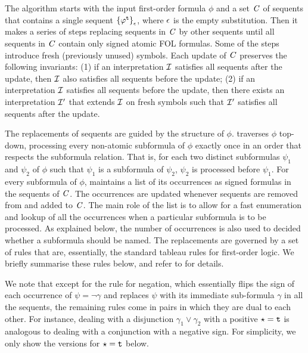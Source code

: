 The \newcnf{} algorithm starts with the input first-order formula $\phi$ and a
set $\mathit{C}$ of sequents that contains a single sequent
${\{{\varphi}^{\mathtt{t}}\}}_{\epsilon}$, where $\epsilon$ is
the empty substitution. Then it makes a series of steps replacing sequents in
$\mathit{C}$ by other sequents until all sequents in $\mathit{C}$ contain only signed atomic
FOL formulas. Some of the steps introduce fresh (previously unused) symbols. 
Each update of $\mathit{C}$ preserves the following invariants: (1) if an interpretation ${\cal I}$
satisfies all sequents after the update, then ${\cal I}$ also satisfies all sequents
before the update; (2) if an interpretation ${\cal I}$
satisfies all sequents before the update, then
there exists an interpretation ${\cal I}'$ 
that extends ${\cal I}$ on fresh symbols such that ${\cal I}'$
satisfies all sequents after the update. 

The replacements of sequents are guided by the structure of $\phi$. \newcnf{}
traverses $\phi$ top-down, processing every non-atomic subformula of $\phi$
exactly once in an order that respects the subformula relation. That is, for
each two distinct subformulas $\psi_1$ and $\psi_2$ of $\phi$ such that $\psi_1$
is a subformula of $\psi_2$, $\psi_2$ is processed before $\psi_1$.
%
For every subformula of $\phi$, \newcnf{} maintains a list of its occurrences as signed formulas in the sequents of $\mathit{C}$. 
The occurrences are updated whenever sequents are removed from and added to $\mathit{C}$. 
The main role of the list is to allow for a fast enumeration and lookup of all the occurrences when a particular subformula 
is to be processed. As explained below, the number of occurrences is also used to decided whether a subformula should be named.
The replacements are governed by a set of rules that are, essentially, the standard tableau rules for first-order logic. We briefly summarise these rules below, and refer to \cite{newcnf_fol} for details.

We note that except for the rule for negation, which essentially 
flips the sign of each occurrence of $\psi = \neg \gamma$ and replaces $\psi$ with its immediate sub-formula $\gamma$
in all the sequents, the remaining rules come in pairs in which they are dual to each other. 
For instance, dealing with a disjunction $\gamma_1 \lor \gamma_2$ with a positive $\star = \mathtt{t}$
is analogous to dealing with a conjunction with a negative sign. 
For simplicity, we only show the versions for $\star = \mathtt{t}$ below.

